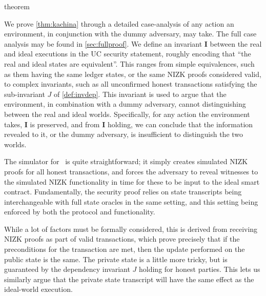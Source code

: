 {theorem}

We prove \autoref{thm:kachina} through a detailed case-analysis of any action an
environment, in conjunction with the dummy adversary, may take. The full case
analysis may be found in \iffull\autoref{sec:fullproof}\else\cite[Appendix~D]{fullversion}\fi. We define an invariant $\boldsymbol I$ between the real and
ideal executions in the UC security statement, roughly encoding that ``the real
and ideal states are equivalent''. This ranges from simple equivalences, such as
them having the same ledger states, or the same NIZK proofs considered valid, to
complex invariants, such as all unconfirmed honest transactions satisfying the
sub-invariant $J$ of \autoref{def:invdep}. This invariant is used to argue that the
environment, in combination with a dummy adversary, cannot distinguishing
between the real and ideal worlds. Specifically, for any action the environment
takes, $\boldsymbol I$ is preserved, and from $\boldsymbol I$ holding, we can
conclude that the information revealed to it, or the dummy adversary, is
insufficient to distinguish the two worlds.

The simulator for \kachina\ is quite straightforward; it simply creates
simulated NIZK proofs for all honest transactions, and forces the adversary to
reveal witnesses to the simulated NIZK functionality in time for these to be
input to the ideal smart contract. Fundamentally, the security proof relies on
state transcripts being interchangeable with full state oracles in the same
setting, and this setting being enforced by both the protocol and functionality.

While a lot of factors must be formally considered, this is derived from
receiving NIZK proofs as part of valid transactions, which prove precisely that
if the preconditions for the transaction are met, then the update performed on
the public state is the same. The private state is a little more tricky, but is
guaranteed by the dependency invariant $J$ holding for honest parties. This lets
us similarly argue that the private state transcript will have the same effect
as the ideal-world execution.

